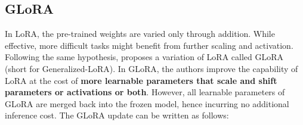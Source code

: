 \subsection{GLoRA}
In LoRA, the pre-trained weights are varied only through addition. While effective, more difficult tasks might benefit from further scaling and activation. Following the same hypothesis, \citet{chavan2023one} proposes a variation of LoRA called GLoRA (short for Generalized-LoRA). In GLoRA, the authors improve the capability of LoRA at the cost of \textbf{more learnable parameters that scale and shift parameters or activations or both}. However, all learnable parameters of GLoRA are merged back into the frozen model, hence incurring no additional inference cost. The GLoRA update can be written as follows:

